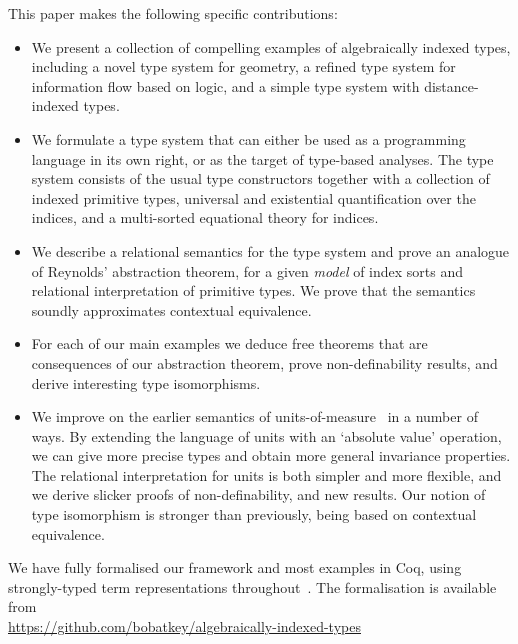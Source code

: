 This paper makes the following specific contributions:
\begin{itemize}
\item 
We present a collection of compelling examples of algebraically
indexed types, including a novel type system for geometry, a
refined type system for information flow based on logic, and a simple
type system with distance-indexed types.
\item 
We formulate a type system that can either be used as a programming
language in its own right, or as the target of type-based
analyses. The type system consists of the usual type constructors
together with a collection of indexed primitive types, universal and
existential quantification over the indices, and a multi-sorted
equational theory for indices.
\item
We describe a relational semantics for the type system and prove an
analogue of Reynolds' abstraction theorem, for a given \emph{model}
of index sorts and relational interpretation of primitive types.
We prove that the semantics soundly approximates contextual equivalence.
\item
For each of our main examples we deduce free theorems that are
consequences of our abstraction theorem, prove non-definability
results, and derive interesting type isomorphisms.
\item
We improve on the earlier semantics of
units-of-measure~\cite{kennedy97relational} in a number of ways.  By
extending the language of units with an `absolute value' operation, we
can give more precise types and obtain more general invariance
properties.  The relational interpretation for units is both simpler
and more flexible, and we derive slicker proofs of non-definability,
and new results.  Our notion of type isomorphism is stronger than
previously, being based on contextual equivalence.
\end{itemize}
We have fully formalised our framework and most examples in Coq,
using strongly-typed term representations
throughout~\cite{TypedSyntax}. The formalisation is available from
\\{\small \url{https://github.com/bobatkey/algebraically-indexed-types}}




